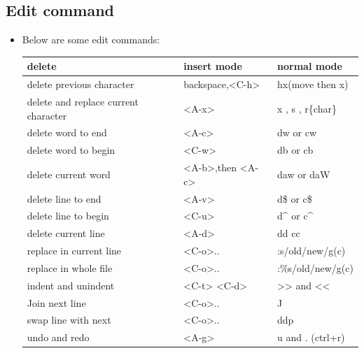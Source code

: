\documentclass[a4paper,12pt,twoside]{book}
\begin{document}
\subsection{Edit command}

\begin{itemize}
\item Below are some edit commands:
\begin{center}
		\begin{tabular}{p{}|p{}|p{}}
		\hline
		delete & insert mode & normal mode\\

   	    \hline 
		delete previous character & backspace,<C-h> & hx(move then x)  \\
	
		\hline 
		delete and replace current character & <A-x> & x , s , r\{char\}  \\
	
		\hline 
		delete word to end & <A-c> &dw or cw  \\
		
		\hline 
		delete word to begin & <C-w> &db or cb  \\

		\hline 
		delete current word &<A-b>,then <A-c> & daw or daW \\
		
		\hline 
		delete line to end & <A-v> & d\$ or c\$  \\
		
		\hline 
		delete line to begin & <C-u> & d\^{} or c\^{}  \\
		
		\hline 
		delete current line & <A-d> & dd cc \\

       \hline
	   replace in current line &<C-o>.. & :s/old/new/g(c) \\

		\hline 
	   replace in whole file &<C-o>.. & :\%s/old/new/g(c) \\

	   \hline
		indent and unindent & <C-t> <C-d> & >> and << \\

	   \hline 
	   Join next line & <C-o>.. & J \\ 

	   \hline 
		swap line with next &<C-o>.. & ddp \\
	
		\hline 
		undo and redo & <A-g> &  u and . (ctrl+r) \\ 
		

\end{tabular}
\end{center}
\end{itemize}
\end{document}
